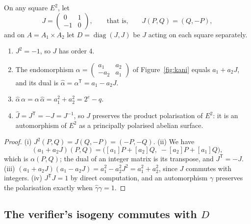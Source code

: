 \begin{definition}
    On any square $E^2$, let
    \[
    J = \begin{pmatrix} 0 & 1 \\ -1 & 0 \end{pmatrix},
    \qquad\text{that is,}\qquad
    J(P, Q) = (Q, -P),
    \]
    and on $A = A_1 \times A_2$ let $D = \operatorname{diag}(J, J)$ be $J$
    acting on each square separately.
\end{definition}

\begin{lemma}
    \label{lem:J}
    \leavevmode
    \begin{enumerate}[label=(\roman*)]
        \item $J^2 = -1$, so $J$ has order 4.
        \item The endomorphism
        $\alpha = \left(\begin{smallmatrix} a_1 & a_2 \\ -a_2 & a_1
        \end{smallmatrix}\right)$ of Figure~\ref{fig:kani} equals
        $a_1 + a_2 J$, and its dual is
        $\widehat{\alpha} = \alpha^{\mathsf{T}} = a_1 - a_2 J$.
        \item $\widehat{\alpha}\,\alpha = \alpha\,\widehat{\alpha} = a_1^2 + a_2^2
        = 2^e - q$.
        \item $\widehat{J} = J^{\mathsf{T}} = -J = J^{-1}$, so $J$ preserves the
        product polarisation of $E^2$: it is an automorphism of $E^2$ as a
        principally polarised abelian surface.
    \end{enumerate}
\end{lemma}

\begin{proof}
    (i) $J^2(P, Q) = J(Q, -P) = (-P, -Q)$. (ii) We have
    \[
    (a_1 + a_2 J)(P, Q) = \bigl([a_1]P + [a_2]Q, \; -[a_2]P + [a_1]Q\bigr),
    \]
    which is $\alpha(P, Q)$; the dual
    of an integer matrix is its transpose, and $J^{\mathsf{T}} = -J$. (iii)
    $(a_1 + a_2 J)(a_1 - a_2 J) = a_1^2 - a_2^2 J^2 = a_1^2 + a_2^2$, since
    $J$ commutes with integers. (iv) $J^{\mathsf{T}} J = 1$ by direct
    computation, and an automorphism $\gamma$ preserves the polarisation
    exactly when $\widehat{\gamma}\gamma = 1$.
\end{proof}

\subsection{The verifier's isogeny commutes with \texorpdfstring{$D$}{D}}

